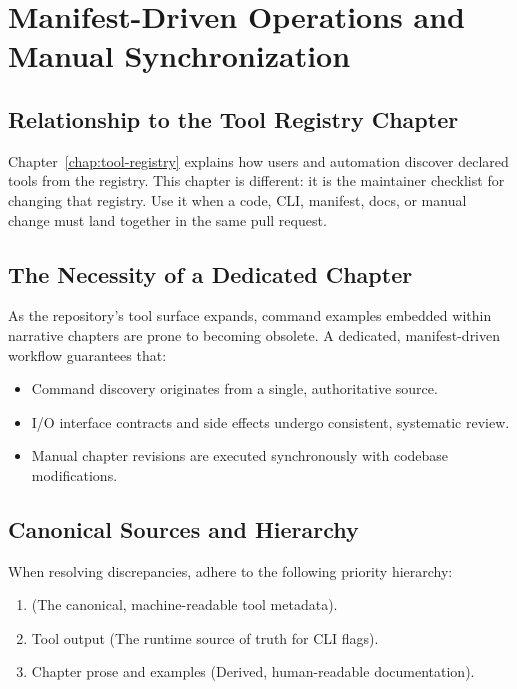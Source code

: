 \chapter{Manifest-Driven Operations and Manual Synchronization}
\label{chap:manual-maintenance}



\section{Relationship to the Tool Registry Chapter}
Chapter~\ref{chap:tool-registry} explains how users and automation discover declared tools from the
registry. This chapter is different: it is the maintainer checklist for changing
that registry. Use it when a code, CLI, manifest, docs, or manual change must
land together in the same pull request.

\section{The Necessity of a Dedicated Chapter}
As the repository's tool surface expands, command examples embedded within narrative chapters are prone to becoming obsolete. A dedicated, manifest-driven workflow guarantees that:
\begin{itemize}
  \item Command discovery originates from a single, authoritative source.
  \item I/O interface contracts and side effects undergo consistent, systematic review.
  \item Manual chapter revisions are executed synchronously with codebase modifications.
\end{itemize}

\section{Canonical Sources and Hierarchy}
When resolving discrepancies, adhere to the following priority hierarchy:
\begin{enumerate}
  \item {} (The canonical, machine-readable tool metadata).
  \item Tool  output (The runtime source of truth for CLI flags).
  \item Chapter prose and examples (Derived, human-readable documentation).
\end{enumerate}

